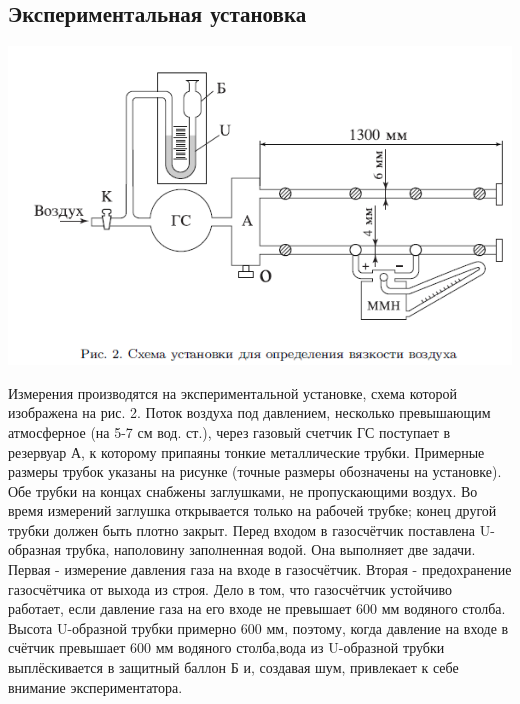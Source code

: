 \documentclass[a4paper, 12pt]{article}%
\begin{document}
\subsection*{Экспериментальная установка}
\begin{center}
    \includegraphics[width = \textwidth]{133_2.png}
  \end{center}
  Измерения производятся на экспериментальной установке, схема которой изображена на рис. 2. Поток воздуха под давлением, несколько превышающим атмосферное (на 5-7 см вод. ст.), через газовый счетчик ГС поступает в резервуар А, к которому припаяны тонкие металлические трубки. Примерные размеры трубок указаны на рисунке (точные размеры обозначены на установке). Обе трубки на концах снабжены заглушками, не пропускающими воздух. Во время измерений заглушка открывается только на рабочей трубке; конец другой трубки должен быть плотно закрыт. Перед входом в газосчётчик поставлена U-образная трубка, наполовину заполненная водой. Она выполняет две задачи. Первая - измерение давления газа на входе в газосчётчик. Вторая - предохранение газосчётчика от выхода из строя. Дело в том, что газосчётчик устойчиво работает, если давление газа на его входе не превышает 600 мм водяного столба. Высота U-образной трубки примерно 600 мм, поэтому, когда давление на входе в счётчик превышает 600 мм водяного столба,вода из U-образной трубки выплёскивается в защитный баллон Б и, создавая шум, привлекает к себе внимание экспериментатора. 
\end{document}
